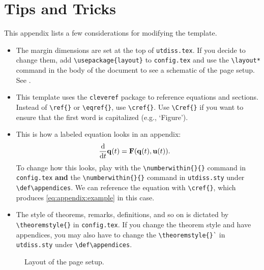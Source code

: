 \chapter{Tips and Tricks}
\label{appendix:tips}

This appendix lists a few considerations for modifying the template.

\begin{itemize}
\item The margin dimensions are set at the top of \texttt{utdiss.tex}. If you decide to change them, add \verb"\usepackage{layout}" to \texttt{config.tex} and use the \verb"\layout*" command in the body of the document to see a schematic of the page setup.
See .

\item This template uses the \texttt{cleveref} package to reference equations and sections.
Instead of \verb"\ref{}" or \verb"\eqref{}", use \verb"\cref{}".
Use \verb"\Cref{}" if you want to ensure that the first word is capitalized (e.g., `Figure').

\item This is how a labeled equation looks in an appendix:
\begin{align}
    \label{eq:appendix:example}
    \frac{\textup{d}}{\textup{d}t}\mathbf{q}(t)
    &= \mathbf{F}(\mathbf{q}(t), \mathbf{u}(t)).
\end{align}
To change how this looks, play with the \verb"\numberwithin{}{}" command in \texttt{config.tex} \textbf{and} the \verb"\numberwithin{}{}" command in \texttt{utdiss.sty} under \verb"\def\appendices".
We can reference the equation with \verb"\cref{}", which produces \cref{eq:appendix:example} in this case.

\item The style of theorems, remarks, definitions, and so on is dictated by \verb"\theoremstyle{}" in \texttt{config.tex}.
If you change the theorem style and have appendices, you may also have to change the \verb"\theoremstyle{}`" in \texttt{utdiss.sty} under \verb"\def\appendices".
\end{itemize}

\newpage
\begin{figure}[t]
    \centering
    \layout*
    \vspace{.75in}
    \caption{Layout of the page setup.}
    \label{figure:layout}
\end{figure}
